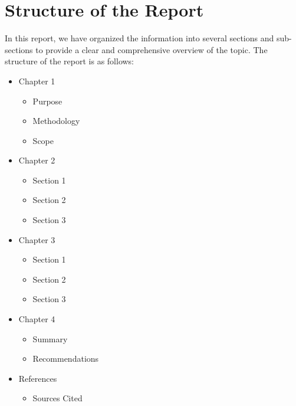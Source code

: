 \section{Structure of the Report}

In this report, we have organized the information into several sections and sub-sections to provide a clear and comprehensive overview of the topic. The structure of the report is as follows:

\begin{itemize}
\item Chapter 1
  \begin{itemize}
  \item Purpose
  \item Methodology
  \item Scope
  \end{itemize}
\item Chapter 2
  \begin{itemize}
  \item Section 1
  \item Section 2
  \item Section 3
  \end{itemize}
\item Chapter 3
  \begin{itemize}
  \item Section 1
  \item Section 2
  \item Section 3
  \end{itemize}
\item Chapter 4
  \begin{itemize}
  \item Summary
  \item Recommendations
  \end{itemize}
\item References
  \begin{itemize}
  \item Sources Cited
  \end{itemize}
\end{itemize}